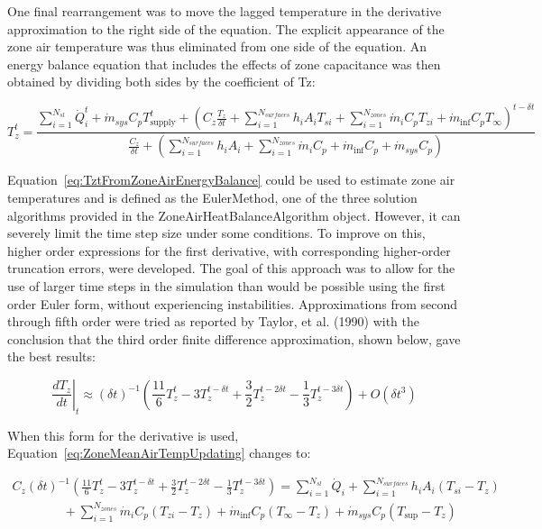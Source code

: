 One final rearrangement was to move the lagged temperature in the derivative approximation to the right side of the equation. The explicit appearance of the zone air temperature was thus eliminated from one side of the equation. An energy balance equation that includes the effects of zone capacitance was then obtained by dividing both sides by the coefficient of Tz:

\begin{equation}
T_z^t = \frac{{\sum\limits_{i = 1}^{{N_{sl}}} {\dot Q_i^t}  + {{\dot m}_{sys}}{C_p}T_{{\mathrm{supply}}}^t + {{\left( {{C_z}\frac{{T_z^{}}}{{\delta t}} + \sum\limits_{i = 1}^{{N_{surfaces}}} {{h_i}} {A_i}{T_{si}} + \sum\limits_{i = 1}^{{N_{zones}}} {{{\dot m}_i}} {C_p}{T_{zi}} + {{\dot m}_{\inf }}{C_p}{T_\infty }} \right)}^{t - \delta t}}}}{{\frac{{{C_z}}}{{\delta t}} + \left( {\sum\limits_{i = 1}^{{N_{surfaces}}} {{h_i}} {A_i} + \sum\limits_{i = 1}^{{N_{zones}}} {{{\dot m}_i}} {C_p} + {{\dot m}_{\inf }}{C_p} + {{\dot m}_{sys}}{C_p}} \right)}}
\label{eq:TztFromZoneAirEnergyBalance}
\end{equation}

Equation~\ref{eq:TztFromZoneAirEnergyBalance} could be used to estimate zone air temperatures and is defined as the EulerMethod, one of the three solution algorithms provided in the ZoneAirHeatBalanceAlgorithm object. However, it can severely limit the time step size under some conditions. To improve on this, higher order expressions for the first derivative, with corresponding higher-order truncation errors, were developed. The goal of this approach was to allow for the use of larger time steps in the simulation than would be possible using the first order Euler form, without experiencing instabilities. Approximations from second through fifth order were tried as reported by Taylor, et al. (1990) with the conclusion that the third order finite difference approximation, shown below, gave the best results:

\begin{equation}
{\left. {\frac{{d{T_z}}}{{dt}}} \right|_t} \approx {\left( {\delta t} \right)^{ - 1}}\left( {\frac{{11}}{6}T_z^t - 3T_z^{t - \delta t} + \frac{3}{2}T_z^{t - 2\delta t} - \frac{1}{3}T_z^{t - 3\delta t}} \right) + O\left( {\delta {t^3}} \right)
\end{equation}

When this form for the derivative is used, Equation~\ref{eq:ZoneMeanAirTempUpdating} changes to:

\begin{equation}
\begin{array}{l}
{C_z}{\left( {\delta t} \right)^{ - 1}}\left( {\frac{{11}}{6}T_z^t - 3T_z^{t - \delta t} + \frac{3}{2}T_z^{t - 2\delta t} - \frac{1}{3}T_z^{t - 3\delta t}} \right) = \sum\limits_{i = 1}^{{N_{sl}}} {{{\dot Q}_i}}  + \sum\limits_{i = 1}^{{N_{surfaces}}} {{h_i}} {A_i}\left( {{T_{si}} - {T_z}} \right) \\
\quad \quad \quad \quad + \sum\limits_{i = 1}^{{N_{zones}}} {{{\dot m}_i}} {C_p}\left( {{T_{zi}} - {T_z}} \right) + {{\dot m}_{\inf }}{C_p}\left( {{T_\infty } - {T_z}} \right) + {{\dot m}_{sys}}{C_p}\left( {{T_{\sup }} - {T_z}} \right)
\end{array}
\end{equation}

